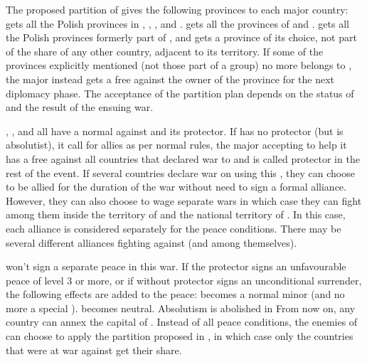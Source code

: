 \aparag The proposed partition of \payspologne gives the following provinces
to each major country:
\bparag \RUS gets all the Polish provinces in \regionUkraine,
\provinceSeveria, \provinceSmolenska, \provinceBaltarusija and
\provincePolacak.
\bparag \PRU gets all the provinces of  and
.
\bparag \AUS gets all the Polish provinces formerly part of \payshongrie,
\provinceMorava and \provinceMalopolska
\bparag \SUE gets a province of its choice, not part of the share of any other
country, adjacent to its territory.
\aparag If some of the provinces explicitly mentioned (not those part of a
group) no more belongs to \payspologne, the major instead gets a free \CB
against the owner of the province for the next diplomacy phase.
\aparag The acceptance of the partition plan depends on the status of
\payspologne and the result of the ensuing war.



\phevnt
\aparag \RUS, \AUS, \PRU and \SUE all have a normal \CB against \payspologne
and its protector.
\bparag If \payspologne has no protector (but is absolutist), it call for
allies as per normal rules, the major accepting to help it has a free \CB
against all countries that declared war to \payspologne and is called
protector in the rest of the event.
\aparag If several countries declare war on \payspologne using this \CB, they
can choose to be allied for the duration of the war without need to sign a
formal alliance.
\bparag However, they can also choose to wage separate wars in which case they
can fight among them inside the territory of \payspologne and the national
territory of \POL. In this case, each alliance is considered separately for
the peace conditions.
\bparag There may be several different alliances fighting against \payspologne
(and among themselves).

\phpaix
\aparag \payspologne won't sign a separate peace in this war.
\aparag If the protector signs an unfavourable peace of level 3 or more, or if
\payspologne without protector signs an unconditional surrender, the following
effects are added to the peace:
\bparag \payspologne becomes a normal minor (and no more a special \EG).
\bparag \payspologne becomes neutral.
\bparag Absolutism is abolished in \payspologne
\bparag From now on, any country can annex the capital of \payspologne.
\bparag Instead of all peace conditions, the enemies of \payspologne can
choose to apply the partition proposed in , in
which case only the countries that were at war against \payspologne get their
share.


